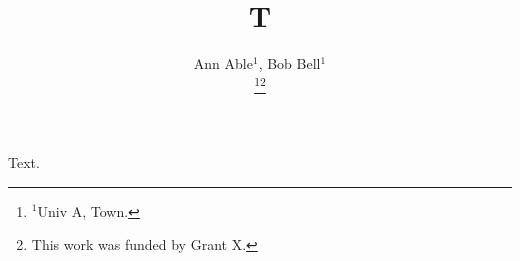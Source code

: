 \documentclass{article}
\title{T}
\author{Ann Able$^{1}$, Bob Bell$^{1}$\\ \thanks{$^{1}$Univ A, Town.}\thanks{This work was funded by Grant X.}}
\begin{document}
\maketitle
Text.
\end{document}
